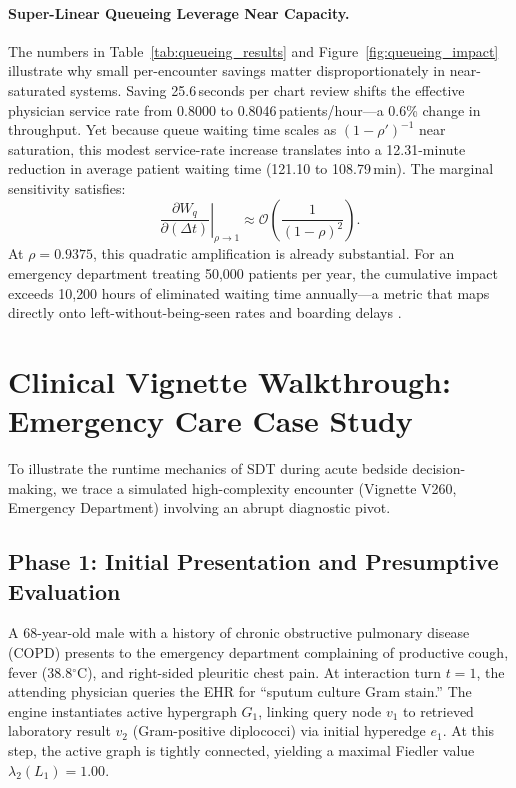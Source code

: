\documentclass[10pt, onecolumn]{article}
\begin{document}
\paragraph{Super-Linear Queueing Leverage Near Capacity.}
The numbers in Table~\ref{tab:queueing_results} and Figure~\ref{fig:queueing_impact} illustrate why small per-encounter savings matter disproportionately in near-saturated systems. Saving 25.6\,seconds per chart review shifts the effective physician service rate from 0.8000 to 0.8046\,patients/hour---a 0.6\% change in throughput. Yet because queue waiting time scales as $(1-\rho')^{-1}$ near saturation, this modest service-rate increase translates into a 12.31-minute reduction in average patient waiting time (121.10 to 108.79\,min). The marginal sensitivity satisfies:
\begin{equation}
  \left.\frac{\partial W_q}{\partial (\Delta t)}\right|_{\rho \to 1} \approx \mathcal{O}\!\left(\frac{1}{(1-\rho)^2}\right).
  \label{eq:deriv_superlinear}
\end{equation}
At $\rho = 0.9375$, this quadratic amplification is already substantial. For an emergency department treating 50{,}000 patients per year, the cumulative impact exceeds 10{,}200 hours of eliminated waiting time annually---a metric that maps directly onto left-without-being-seen rates and boarding delays \cite{armony2015patient,singer2011crowding}.

\section{Clinical Vignette Walkthrough: Emergency Care Case Study}
\label{sec:case_study}

To illustrate the runtime mechanics of SDT during acute bedside decision-making, we trace a simulated high-complexity encounter (Vignette V260, Emergency Department) involving an abrupt diagnostic pivot.

\subsection{Phase 1: Initial Presentation and Presumptive Evaluation}
A 68-year-old male with a history of chronic obstructive pulmonary disease (COPD) presents to the emergency department complaining of productive cough, fever (38.8$^\circ$C), and right-sided pleuritic chest pain. At interaction turn $t=1$, the attending physician queries the EHR for ``sputum culture Gram stain.'' The engine instantiates active hypergraph $G_1$, linking query node $v_1$ to retrieved laboratory result $v_2$ (Gram-positive diplococci) via initial hyperedge $e_1$. At this step, the active graph is tightly connected, yielding a maximal Fiedler value $\lambda_2(L_1) = 1.00$.
\end{document}

